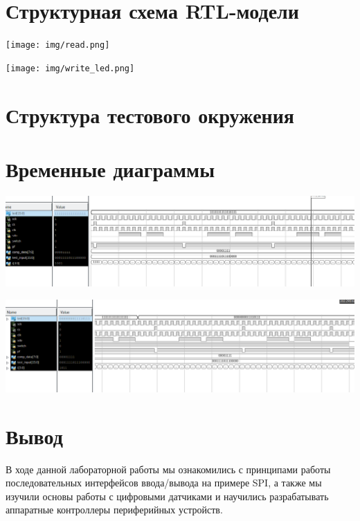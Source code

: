 



\section{Структурная схема RTL-модели}
\begin{centering}
\texttt{[image: img/read.png]}

\texttt{[image: img/write\_led.png]}
\end{centering}

\section{Структура тестового окружения}


\section{Временные диаграммы}
\begin{centering}
\includegraphics[width=\textwidth]{img/graph1.png}

\includegraphics[width=\textwidth]{img/graph2.png}
\end{centering}
\section{Вывод}
В ходе данной лабораторной работы мы ознакомились с принципами работы последовательных
интерфейсов ввода/вывода на примере SPI, а также мы изучили основы работы с
цифровыми датчиками и научились разрабатывать аппаратные контроллеры периферийных
устройств.

